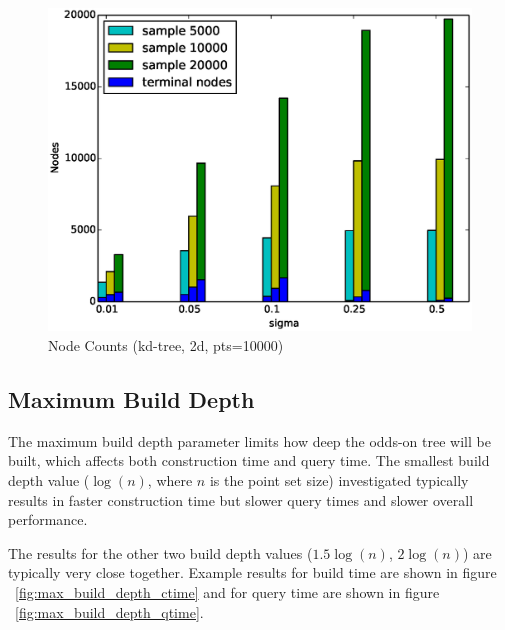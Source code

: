 \documentclass[mcs]{scsthesis}
\begin{document}
\begin{figure}
\begin{center}
\includegraphics[scale=0.5]{diagrams/kt_2d_nodecounts_pts10000_groupbysample.eps}
\caption{Node Counts (kd-tree, 2d, pts=10000)}
\label{fig:sample_set_size_nodecounts}
\end{center}
\end{figure}

\subsection{Maximum Build Depth}

The maximum build depth parameter limits how deep the odds-on tree will be
built, which affects both construction time and query time. The smallest build
depth value ($\log(n)$, where $n$ is the point set size) investigated typically
results in faster construction time but slower query times and slower overall
performance.

The results for the other two build depth values ($1.5\log(n)$, $2\log(n)$)
are typically very close together.  Example results for build time are shown in
figure ~\ref{fig:max_build_depth_ctime} and for query time are shown in figure
~\ref{fig:max_build_depth_qtime}.
\end{document}
